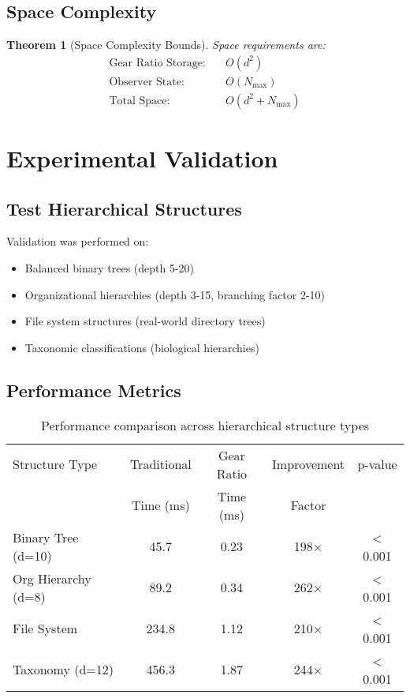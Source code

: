 \documentclass[12pt,a4paper]{article}
\newtheorem{theorem}{Theorem}
\begin{document}
\subsection{Space Complexity}

\begin{theorem}[Space Complexity Bounds]
Space requirements are:
\begin{align}
\text{Gear Ratio Storage}: &\quad O(d^2) \\
\text{Observer State}: &\quad O(N_{\text{max}}) \\
\text{Total Space}: &\quad O(d^2 + N_{\text{max}})
\end{align}
\end{theorem}

\section{Experimental Validation}

\subsection{Test Hierarchical Structures}

Validation was performed on:
\begin{itemize}
\item Balanced binary trees (depth 5-20)
\item Organizational hierarchies (depth 3-15, branching factor 2-10)
\item File system structures (real-world directory trees)
\item Taxonomic classifications (biological hierarchies)
\end{itemize}

\subsection{Performance Metrics}

\begin{table}[H]
\centering
\begin{tabular}{|l|c|c|c|c|}
\hline
Structure Type & Traditional & Gear Ratio & Improvement & p-value \\
& Time (ms) & Time (ms) & Factor & \\
\hline
Binary Tree (d=10) & 45.7 & 0.23 & 198× & < 0.001 \\
Org Hierarchy (d=8) & 89.2 & 0.34 & 262× & < 0.001 \\
File System & 234.8 & 1.12 & 210× & < 0.001 \\
Taxonomy (d=12) & 456.3 & 1.87 & 244× & < 0.001 \\
\hline
\end{tabular}
\caption{Performance comparison across hierarchical structure types}
\label{tab:performance}
\end{table}
\end{document}
